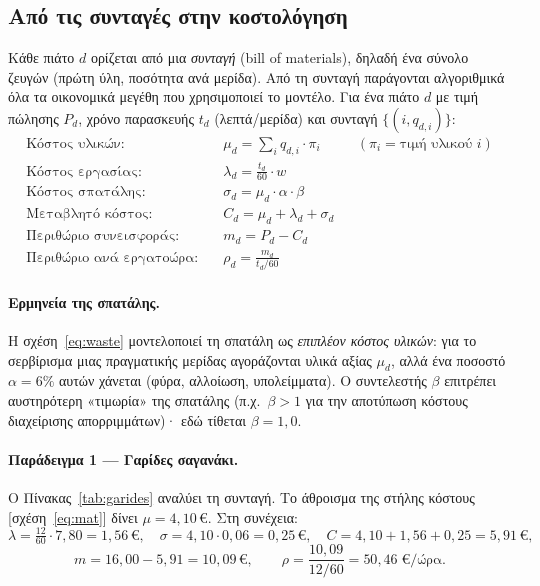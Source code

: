 \documentclass[11pt,a4paper]{article}
\newcommand{\en}[1]{\textenglish{#1}}
\begin{document}
\subsection{Από τις συνταγές στην κοστολόγηση}\label{sec:costing}
Κάθε πιάτο $d$ ορίζεται από μια \emph{συνταγή} (\en{bill of materials}), δηλαδή ένα
σύνολο ζευγών (πρώτη ύλη, ποσότητα ανά μερίδα). Από τη συνταγή παράγονται
αλγοριθμικά όλα τα οικονομικά μεγέθη που χρησιμοποιεί το μοντέλο. Για ένα πιάτο $d$
με τιμή πώλησης $P_d$, χρόνο παρασκευής $t_d$ (λεπτά/μερίδα) και συνταγή
$\{(i,q_{d,i})\}$:
\begin{align}
\text{Κόστος υλικών:}   & \quad \mu_d = \sum_i q_{d,i}\cdot \pi_i
   &&(\pi_i = \text{τιμή υλικού } i)\label{eq:mat}\\
\text{Κόστος εργασίας:} & \quad \lambda_d = \tfrac{t_d}{60}\cdot w \label{eq:lab}\\
\text{Κόστος σπατάλης:} & \quad \sigma_d = \mu_d\cdot \alpha\cdot \beta \label{eq:waste}\\
\text{Μεταβλητό κόστος:}& \quad C_d = \mu_d + \lambda_d + \sigma_d \label{eq:var}\\
\text{Περιθώριο συνεισφοράς:} & \quad m_d = P_d - C_d \label{eq:margin}\\
\text{Περιθώριο ανά εργατοώρα:} & \quad \rho_d = \frac{m_d}{t_d/60} \label{eq:rho}
\end{align}

\paragraph{Ερμηνεία της σπατάλης.} Η σχέση~\eqref{eq:waste} μοντελοποιεί τη σπατάλη
ως \emph{επιπλέον κόστος υλικών}: για το σερβίρισμα μιας πραγματικής μερίδας
αγοράζονται υλικά αξίας $\mu_d$, αλλά ένα ποσοστό $\alpha=6\%$ αυτών χάνεται (φύρα,
αλλοίωση, υπολείμματα). Ο συντελεστής $\beta$ επιτρέπει αυστηρότερη «τιμωρία» της
σπατάλης (π.χ.\ $\beta>1$ για την αποτύπωση κόστους διαχείρισης απορριμμάτων)· εδώ
τίθεται $\beta=1,0$.

\paragraph{Παράδειγμα 1 — Γαρίδες σαγανάκι.} Ο Πίνακας~\ref{tab:garides} αναλύει τη
συνταγή. Το άθροισμα της στήλης κόστους [σχέση~\eqref{eq:mat}] δίνει $\mu=4{,}10$\,€.
Στη συνέχεια:
\[
\lambda = \tfrac{12}{60}\cdot 7{,}80 = 1{,}56\,€,\quad
\sigma = 4{,}10\cdot 0{,}06 = 0{,}25\,€,\quad
C = 4{,}10+1{,}56+0{,}25 = 5{,}91\,€,
\]
\[
m = 16{,}00 - 5{,}91 = 10{,}09\,€,\qquad
\rho = \frac{10{,}09}{12/60} = 50{,}46\;€/\text{ώρα}.
\]
\end{document}
